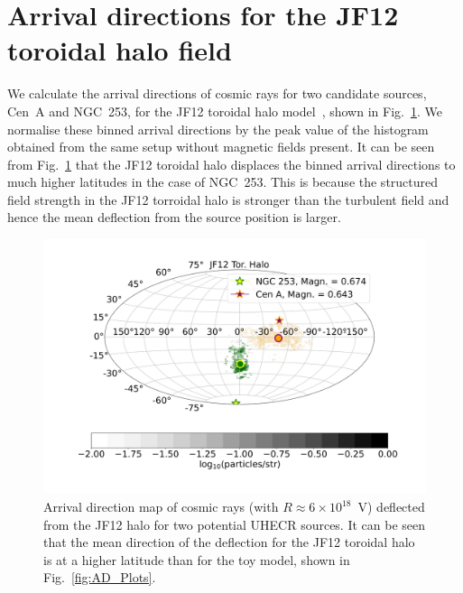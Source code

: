 \documentclass[usenatbib]{mnras}
\begin{document}

\section{Arrival directions for the JF12 toroidal halo field}
\label{Appendix_D}
We calculate the arrival directions of cosmic rays for two candidate sources, Cen~A and NGC~253, for the JF12 toroidal halo model~\citep{JF12}, shown in Fig.~\ref{JF12_AD}. We normalise these binned arrival directions by the peak value of the histogram obtained from the same setup without magnetic fields present. It can be seen from Fig.~\ref{JF12_AD} that the JF12 toroidal halo displaces the binned arrival directions to much higher latitudes in the case of NGC~253. This is because the structured field strength in the JF12 torroidal halo is stronger than the turbulent field and hence the mean deflection from the source position is larger.
\begin{figure}
\centering
\includegraphics[width=0.60\linewidth]{Images/Bins_180_CenA_NGC253_JF12_Halo_40_EeV.png}
 \caption{Arrival direction map of cosmic rays (with $R \approx 6 \times 10^{18}$~V) deflected from the JF12 halo for two potential UHECR sources. It can be seen that the mean direction of the deflection for the JF12 toroidal halo is at a higher latitude than for the toy model, shown in Fig.~\ref{fig:AD_Plots}.}
\label{JF12_AD}
\end{figure}
\end{document}
